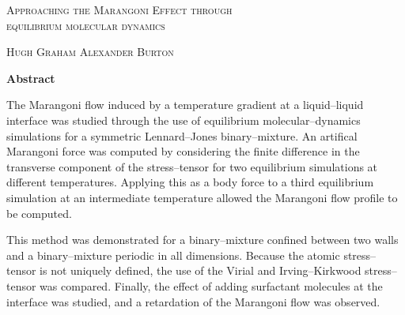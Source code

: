 \thispagestyle{plain}
\begin{center}
\textsc{\Large Approaching the Marangoni Effect through\\ equilibrium molecular dynamics}

    \vspace{0.2cm}
    \normalsize{{\textsc{Hugh Graham Alexander Burton}}}
    
\vspace{0.2cm}
    \normalsize{\textbf{Abstract}}
\end{center}
The Marangoni flow induced by a temperature gradient at a liquid--liquid interface was studied through the use of equilibrium molecular--dynamics simulations for a symmetric Lennard--Jones binary--mixture.
An artifical Marangoni force was computed by considering the finite difference in the transverse component of the stress--tensor for two equilibrium simulations at different temperatures.
Applying this as a body force to a third equilibrium simulation at an intermediate temperature allowed the Marangoni flow profile to be computed.

This method was demonstrated for a binary--mixture confined between two walls and a binary--mixture periodic in all dimensions. Because the atomic stress--tensor is not uniquely defined, the use of the Virial and Irving--Kirkwood stress--tensor was compared.
Finally, the effect of adding surfactant molecules at the interface was studied, and a retardation of the Marangoni flow was observed.
